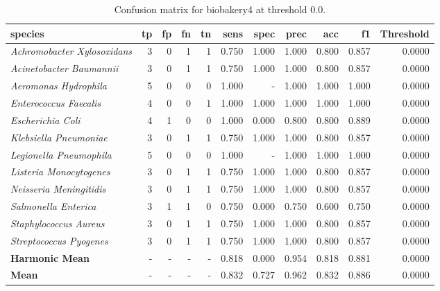\begin{table}[H]
\centering
\begin{tabular}{lrrrrrrrrrr}
\hline
\textbf{species} & \textbf{tp} & \textbf{fp} & \textbf{fn} & \textbf{tn} & \textbf{sens} & \textbf{spec} & \textbf{prec} & \textbf{acc} & \textbf{f1} & \textbf{Threshold} \\
\hline
\itshape Achromobacter Xylosoxidans & 3 & 0 & 1 & 1 & 0.750 & 1.000 & 1.000 & 0.800 & 0.857 & 0.0000 \\
\itshape Acinetobacter Baumannii & 3 & 0 & 1 & 1 & 0.750 & 1.000 & 1.000 & 0.800 & 0.857 & 0.0000 \\
\itshape Aeromonas Hydrophila & 5 & 0 & 0 & 0 & 1.000 & - & 1.000 & 1.000 & 1.000 & 0.0000 \\
\itshape Enterococcus Faecalis & 4 & 0 & 0 & 1 & 1.000 & 1.000 & 1.000 & 1.000 & 1.000 & 0.0000 \\
\itshape Escherichia Coli & 4 & 1 & 0 & 0 & 1.000 & 0.000 & 0.800 & 0.800 & 0.889 & 0.0000 \\
\itshape Klebsiella Pneumoniae & 3 & 0 & 1 & 1 & 0.750 & 1.000 & 1.000 & 0.800 & 0.857 & 0.0000 \\
\itshape Legionella Pneumophila & 5 & 0 & 0 & 0 & 1.000 & - & 1.000 & 1.000 & 1.000 & 0.0000 \\
\itshape Listeria Monocytogenes & 3 & 0 & 1 & 1 & 0.750 & 1.000 & 1.000 & 0.800 & 0.857 & 0.0000 \\
\itshape Neisseria Meningitidis & 3 & 0 & 1 & 1 & 0.750 & 1.000 & 1.000 & 0.800 & 0.857 & 0.0000 \\
\itshape Salmonella Enterica & 3 & 1 & 1 & 0 & 0.750 & 0.000 & 0.750 & 0.600 & 0.750 & 0.0000 \\
\itshape Staphylococcus Aureus & 3 & 0 & 1 & 1 & 0.750 & 1.000 & 1.000 & 0.800 & 0.857 & 0.0000 \\
\itshape Streptococcus Pyogenes & 3 & 0 & 1 & 1 & 0.750 & 1.000 & 1.000 & 0.800 & 0.857 & 0.0000 \\
\bfseries Harmonic Mean & - & - & - & - & 0.818 & 0.000 & 0.954 & 0.818 & 0.881 & 0.0000 \\
\bfseries Mean & - & - & - & - & 0.832 & 0.727 & 0.962 & 0.832 & 0.886 & 0.0000 \\
\end{tabular}
\caption{Confusion matrix for biobakery4 at threshold 0.0.}
\label{tab:conf_biobakery4_0.0}
\end{table}
